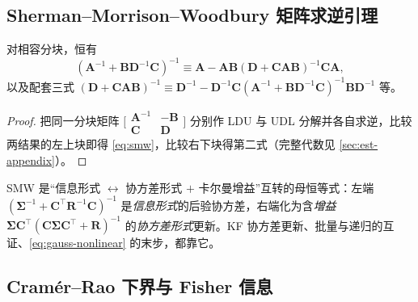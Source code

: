 \subsection{Sherman–Morrison–Woodbury 矩阵求逆引理}
\label{sec:est-smw}

\begin{lemma}\label{lem:smw}
对相容分块，恒有
\begin{equation}
  (\mathbf{A}^{-1}+\mathbf{B}\mathbf{D}^{-1}\mathbf{C})^{-1}\equiv\mathbf{A}-\mathbf{A}\mathbf{B}(\mathbf{D}+\mathbf{C}\mathbf{A}\mathbf{B})^{-1}\mathbf{C}\mathbf{A},
  \label{eq:smw}
\end{equation}
以及配套三式 $(\mathbf{D}+\mathbf{C}\mathbf{A}\mathbf{B})^{-1}\equiv\mathbf{D}^{-1}-\mathbf{D}^{-1}\mathbf{C}(\mathbf{A}^{-1}+\mathbf{B}\mathbf{D}^{-1}\mathbf{C})^{-1}\mathbf{B}\mathbf{D}^{-1}$ 等。
\end{lemma}
\begin{proof}
把同一分块矩阵 $\big[\begin{smallmatrix}\mathbf{A}^{-1}&-\mathbf{B}\\\mathbf{C}&\mathbf{D}\end{smallmatrix}\big]$ 分别作 LDU 与 UDL 分解并各自求逆，比较两结果的左上块即得 \cref{eq:smw}，比较右下块得第二式（完整代数见 \cref{sec:est-appendix}）。
\end{proof}
\noindent SMW 是“信息形式 $\leftrightarrow$ 协方差形式 $+$ 卡尔曼增益”互转的母恒等式：左端 $(\boldsymbol{\Sigma}^{-1}+\mathbf{C}^\top\mathbf{R}^{-1}\mathbf{C})^{-1}$ 是\emph{信息形式}的后验协方差，右端化为含\emph{增益} $\boldsymbol{\Sigma}\mathbf{C}^\top(\mathbf{C}\boldsymbol{\Sigma}\mathbf{C}^\top+\mathbf{R})^{-1}$ 的\emph{协方差形式}更新。KF 协方差更新、批量与递归的互证、\cref{eq:gauss-nonlinear} 的末步，都靠它。

\subsection{Cramér–Rao 下界与 Fisher 信息}
\label{sec:est-crlb}

